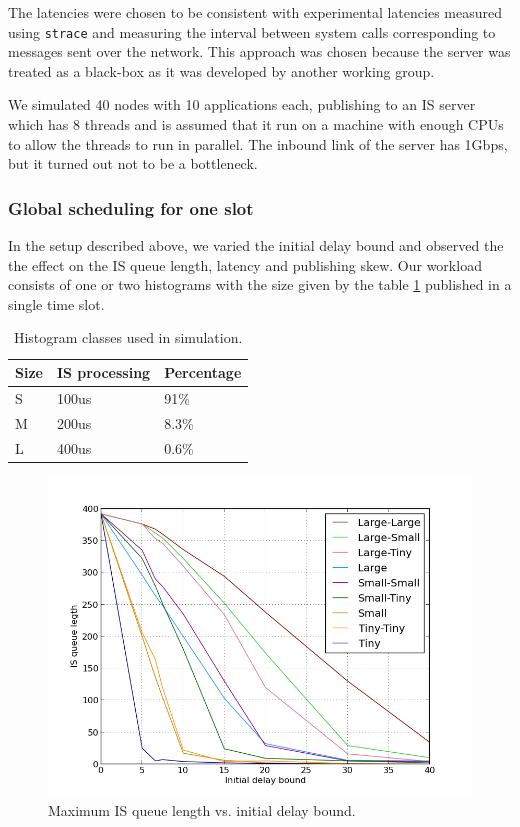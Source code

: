 The latencies were chosen to be consistent with experimental latencies measured using {\tt strace} and measuring the interval between system calls corresponding to messages sent over the network. This approach was chosen because the server was treated as a black-box as it was developed by another working group. 

We simulated 40 nodes with 10 applications each, publishing to an IS server which has 8 threads and is assumed that it run on a machine with enough CPUs to allow the threads to run in parallel. The inbound link of the server has 1Gbps, but it turned out not to be a bottleneck.

\subsubsection*{Global scheduling for one slot}

In the setup described above, we varied the initial delay bound and observed the the effect on the IS queue length, latency and publishing skew. Our workload consists of one or two histograms with the size given by the table \ref{tab:histosize} published in a single time slot. 

\begin{table}
\centering
\begin{tabular}[ht]{ | l | l | l | }
  \hline                        
  Size & IS processing & Percentage \\
  \hline                        
  S & 100us & 91\% \\
  \hline  
  M & 200us & 8.3\% \\
  \hline  
  L & 400us & 0.6\% \\
  \hline  
\end{tabular}
\caption{Histogram classes used in simulation.}
\label{tab:histosize}
\end{table}

\begin{figure}[ht]
\centering
\includegraphics[scale=0.5]{Images/one_slot_sim_qlen.png}
\caption{Maximum IS queue length vs. initial delay bound.}
\label{fig:one_slot_sim_qlen}
\end{figure}

